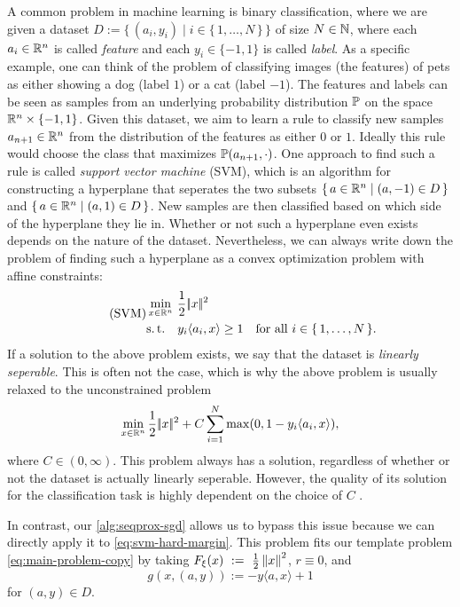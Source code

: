 A common problem in machine learning
is binary classification, where we are given a dataset
$D := \{\, (a_i, y_i) \mid i\in\{\, 1,\dots,N \,\} \,\}$
of size $N\in\mathbb{N}$, where each
$a_i\in\mathbb{R}^n$ is called \textit{feature}
and each $y_i\in \{ -1, 1 \}$ is called
\textit{label}. As a specific example, one can think of the problem of
classifying images (the features) of pets
as either showing a dog (label $1$) or a cat (label $-1$).
The features and labels can be seen as samples from an underlying
probability distribution $\mathbb{P}$ on the space $\mathbb{R}^n \times \{-1, 1\}$.
Given this dataset, we aim to learn a rule to classify 
new samples $a_{n+1}\in\mathbb{R}^n$ from the distribution of the features
as either $0$ or $1$. Ideally this rule would
choose the class that maximizes $\mathbb{P}(a_{n+1}, \cdot)$.
One approach to find such a rule is called \textit{support vector machine} (SVM),
which is an algorithm for constructing a hyperplane that seperates the two
subsets $\{\, a\in \mathbb{R}^n \mid (a, -1) \in D  \,\}$
and $\{\, a\in \mathbb{R}^n \mid (a, 1) \in D  \,\}$.
New samples are then classified based
on which side of the hyperplane they lie in.
Whether or not such a hyperplane even exists depends on the nature
of the dataset.  Nevertheless, we can always write down the problem of finding
such a hyperplane as a convex optimization problem
with affine constraints:
\begin{equation}
    \label{eq:svm-hard-margin}
    \tag{SVM}
    \begin{aligned}
    &\min_{x \in \mathbb{R}^n} \,
        \frac{1}{2} |\!|x|\!|^2 \\
    &\textup{s.\,t.}\quad
    y_i \langle a_i, x \rangle \geq 1 \quad\textnormal{for all $i\in\{ \, 1,\dots,N \, \}$}.
    \end{aligned}
\end{equation}
If a solution to the above problem exists, we say that the dataset is
\textit{linearly seperable}.
This is often not the case, which is why the above problem is usually relaxed to the unconstrained problem
\[
    \min_{x\in\mathbb{R}^n} \frac{1}{2} |\!|x|\!|^2 + C \sum_{i=1}^{N} \max(0, 1 - y_i \langle a_i, x \rangle), 
\]
where $C\in (0, \infty)$. This problem always has a solution, regardless of whether
or not the dataset is actually linearly seperable. However,
the quality of its solution for the classification task is highly
dependent on the choice of $C$ \cite{hastie2004entire}.

In contrast, our \cref{alg:seqprox-sgd} allows us to bypass this issue because we can directly apply it to
\eqref{eq:svm-hard-margin}.
This problem fits our template problem \eqref{eq:main-problem-copy} by taking
$F_\xi(x)~:=~\frac{1}{2}\left\lVert x\right\rVert^2$, $r \equiv 0$,
and
\[
    g(x, (a, y)) := -y \langle a, x \rangle + 1
\]
for $(a, y) \in D$.

